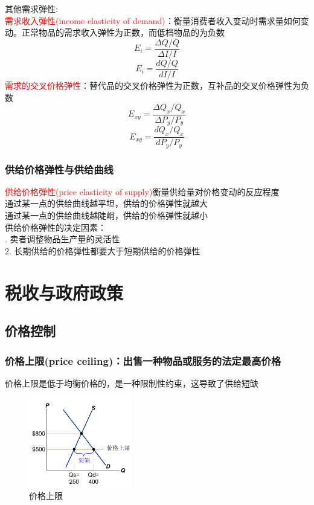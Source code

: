\documentclass[12pt,a4paper]{article}
\begin{document}
其他需求弹性:\\

\textcolor{red}{需求收入弹性(income elasticity of demand)}：衡量消费者收入变动时需求量如何变动。正常物品的需求收入弹性为正数，而低档物品的为负数
$$E_{i} = \frac{\Delta Q / Q}{\Delta I / I}$$
$$E_{i} = \frac{dQ / Q}{dI / I}$$
\textcolor{red}{需求的交叉价格弹性}：替代品的交叉价格弹性为正数，互补品的交叉价格弹性为负数
$$E_{xy} = \frac{\Delta Q_x / Q_x}{\Delta P_y / P_y}$$
$$E_{xy} = \frac{dQ_x / Q_x}{dP_y / P_y}$$

\subsubsection{供给价格弹性与供给曲线}
\textcolor{red}{供给价格弹性(price elasticity of supply)}衡量供给量对价格变动的反应程度\\

\noindent 通过某一点的供给曲线越平坦，供给的价格弹性就越大\\
通过某一点的供给曲线越陡峭，供给的价格弹性就越小\\

供给价格弹性的决定因素：\\
. 卖者调整物品生产量的灵活性\\
2. 长期供给的价格弹性都要大于短期供给的价格弹性


\section{税收与政府政策}
\subsection{价格控制}
\subsubsection{价格上限(price ceiling)：出售一种物品或服务的法定最高价格}
价格上限是低于均衡价格的，是一种限制性约束，这导致了供给短缺
\begin{figure}[H] 
  \centering %
  \includegraphics[width=0.4\textwidth]{价格上限.png} 
  \caption{价格上限} %
\end{figure}
\end{document}

